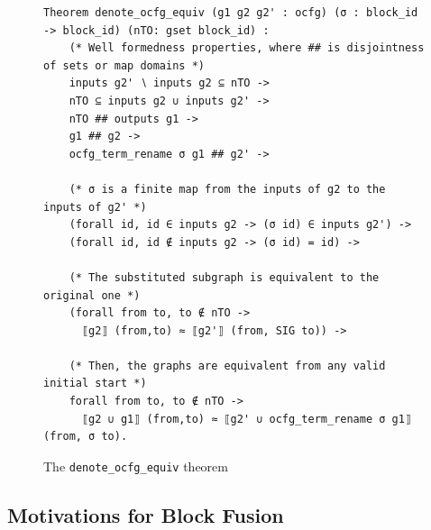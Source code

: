 \documentclass[11pt]{article}
\newcommand{\inlinecoq}[1]{\mbox{\lstinline[style=customcoq,columns=fixed,basewidth=.48em]{#1}}}
\newcommand{\ilc}[1]{\inlinecoq{#1}}
\begin{document}



\begin{figure}
\begin{lstlisting}[style=customcoq,basicstyle=\small\ttfamily]
Theorem denote_ocfg_equiv (g1 g2 g2' : ocfg) (σ : block_id -> block_id) (nTO: gset block_id) :
    (* Well formedness properties, where ## is disjointness of sets or map domains *)
    inputs g2' ∖ inputs g2 ⊆ nTO -> 
    nTO ⊆ inputs g2 ∪ inputs g2' -> 
    nTO ## outputs g1 ->
    g1 ## g2 -> 
    ocfg_term_rename σ g1 ## g2' ->

    (* σ is a finite map from the inputs of g2 to the inputs of g2' *)
    (forall id, id ∈ inputs g2 -> (σ id) ∈ inputs g2') ->
    (forall id, id ∉ inputs g2 -> (σ id) = id) ->

    (* The substituted subgraph is equivalent to the original one *)
    (forall from to, to ∉ nTO -> 
      ⟦g2⟧ (from,to) ≈ ⟦g2'⟧ (from, SIG to)) ->

    (* Then, the graphs are equivalent from any valid initial start *)
    forall from to, to ∉ nTO ->
      ⟦g2 ∪ g1⟧ (from,to) ≈ ⟦g2' ∪ ocfg_term_rename σ g1⟧ (from, σ to).
  \end{lstlisting}
  \caption{The \ilc{denote_ocfg_equiv} theorem}
  \label{fig:ocfg_equiv}
\end{figure}

\subsection{Motivations for Block Fusion}
\end{document}
